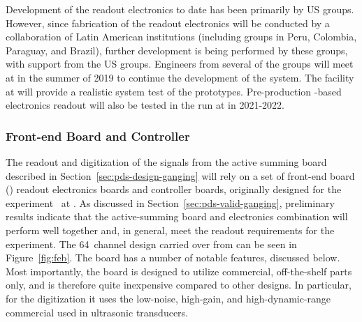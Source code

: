 Development of the readout electronics to date has been primarily by US groups. 
However, since fabrication of the  readout electronics will be conducted by a collaboration of Latin American institutions (including groups in Peru, Colombia, Paraguay, and Brazil), further development is being performed by these groups, with support from the US groups.  Engineers from several of the groups will meet at  in the summer of 2019 to continue the development of the system. The  facility at  will provide a realistic system test of the prototypes.  Pre-production -based electronics readout will also be tested in the  run at  in 2021-2022.

\subsubsection{Front-end Board and Controller}

The readout and digitization of the signals from the active summing board described in Section~\ref{sec:pds-design-ganging} will rely on a set of front-end board () readout electronics boards and controller boards, originally designed for the  experiment~\cite{bib:mu2e_tdr}
at . As discussed in Section~\ref{sec:pds-valid-ganging}, preliminary results indicate that the active-summing board and  electronics  combination will perform well together and, in general, meet the readout requirements for the experiment. The 64~channel  design carried over from  can be seen in Figure~\ref{fig:feb}. The board has a number of notable features, discussed below. Most importantly,  
the board is designed to utilize commercial, off-the-shelf parts only, and is therefore quite inexpensive compared to other designs. In particular, for the digitization it uses the low-noise, high-gain, and high-dynamic-range commercial  used in ultrasonic transducers. 

